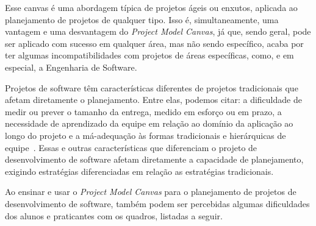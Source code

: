 \documentclass[a4]{report}
\begin{document}
Esse canvas é uma abordagem típica de projetos ágeis ou enxutos, aplicada ao planejamento de projetos de qualquer tipo. Isso é, simultaneamente, uma vantagem e uma desvantagem do \textit{Project Model Canvas}, já que, sendo geral, pode ser aplicado com sucesso em qualquer área, mas não sendo específico, acaba por ter algumas incompatibilidades com projetos de áreas específicas, como, e em especial, a Engenharia de Software.

Projetos de software têm características diferentes de projetos tradicionais que afetam diretamente o planejamento. Entre elas, podemos citar: a dificuldade de medir ou prever o tamanho da entrega, medido em esforço ou em prazo\citeauthor{mike:agile:estimating,cocomo2:manual,pressman:2019}, a necessidade de aprendizado da equipe em relação ao domínio da aplicação ao longo do projeto e a má-adequação às formas tradicionais e hierárquicas de equipe~\citep{Constantine1993}. Essas e outras características que diferenciam o projeto de desenvolvimento de software afetam diretamente a capacidade de planejamento, exigindo estratégias diferenciadas em relação as estratégias tradicionais.

Ao ensinar e usar o \textit{Project Model Canvas} para o planejamento de projetos de desenvolvimento de software, também podem ser percebidas algumas dificuldades dos alunos e praticantes com os quadros, listadas a seguir.
\end{document}
